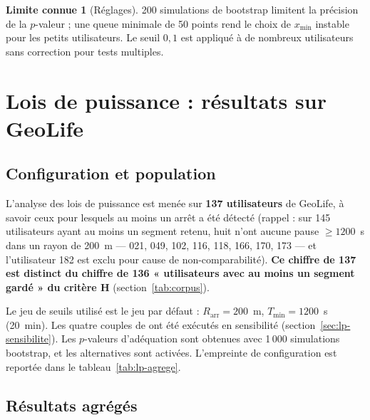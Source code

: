 \documentclass[12pt,a4paper]{report}
\theoremstyle{definition}
\newtheorem{limite}{Limite connue}[chapter]
\DeclareRobustCommand{\code}[1]{\texorpdfstring{\texttt{\detokenize{#1}}}{\detokenize{#1}}}
\begin{document}
\begin{limite}[Réglages]
200 simulations de bootstrap limitent la précision de la $p$-valeur ; une queue minimale
de 50 points rend le choix de $x_{\min}$ instable pour les petits utilisateurs. Le seuil
$0{,}1$ est appliqué à de nombreux utilisateurs sans correction pour tests multiples.
\end{limite}

\chapter{Lois de puissance : résultats sur GeoLife}
\label{ch:lp-resultats}

\section{Configuration et population}

L'analyse des lois de puissance est menée sur \textbf{137 utilisateurs} de GeoLife, à
savoir ceux pour lesquels au moins un arrêt a été détecté (rappel : sur 145 utilisateurs
ayant au moins un segment retenu, huit n'ont aucune pause $\ge 1200$~s dans un rayon de
200~m — 021, 049, 102, 116, 118, 166, 170, 173 — et l'utilisateur 182 est exclu pour
cause de non-comparabilité). \textbf{Ce chiffre de 137 est distinct du chiffre de 136
« utilisateurs avec au moins un segment gardé » du critère H} (section~\ref{tab:corpus}).

Le jeu de seuils utilisé est le jeu par défaut : $R_{\mathrm{arr}} = 200$~m,
$T_{\min} = 1200$~s (20~min). Les quatre couples de \code{ARRET_JEUX_SENSIBILITE} ont
été exécutés en sensibilité (section~\ref{sec:lp-sensibilite}). Les $p$-valeurs
d'adéquation sont obtenues avec 1\,000 simulations bootstrap, et les alternatives sont
activées. L'empreinte de configuration est reportée dans le tableau~\ref{tab:lp-agrege}.

\section{Résultats agrégés}
\end{document}
